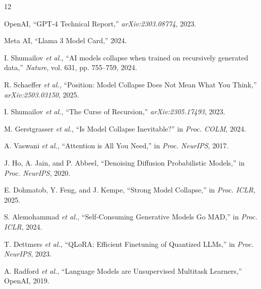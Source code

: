 \documentclass[conference]{IEEEtran}
\begin{document}

\begin{thebibliography}{12}

OpenAI, ``GPT-4 Technical Report,'' \textit{arXiv:2303.08774}, 2023.

Meta AI, ``Llama 3 Model Card,'' 2024.

I. Shumailov \textit{et al.}, ``AI models collapse when trained on recursively generated data,'' \textit{Nature}, vol. 631, pp. 755--759, 2024.

R. Schaeffer \textit{et al.}, ``Position: Model Collapse Does Not Mean What You Think,'' \textit{arXiv:2503.03150}, 2025.

I. Shumailov \textit{et al.}, ``The Curse of Recursion,'' \textit{arXiv:2305.17493}, 2023.

M. Gerstgrasser \textit{et al.}, ``Is Model Collapse Inevitable?'' in \textit{Proc. COLM}, 2024.

A. Vaswani \textit{et al.}, ``Attention is All You Need,'' in \textit{Proc. NeurIPS}, 2017.

J. Ho, A. Jain, and P. Abbeel, ``Denoising Diffusion Probabilistic Models,'' in \textit{Proc. NeurIPS}, 2020.

E. Dohmatob, Y. Feng, and J. Kempe, ``Strong Model Collapse,'' in \textit{Proc. ICLR}, 2025.

S. Alemohammad \textit{et al.}, ``Self-Consuming Generative Models Go MAD,'' in \textit{Proc. ICLR}, 2024.

T. Dettmers \textit{et al.}, ``QLoRA: Efficient Finetuning of Quantized LLMs,'' in \textit{Proc. NeurIPS}, 2023.

A. Radford \textit{et al.}, ``Language Models are Unsupervised Multitask Learners,'' OpenAI, 2019.

\end{thebibliography}
\end{document}
